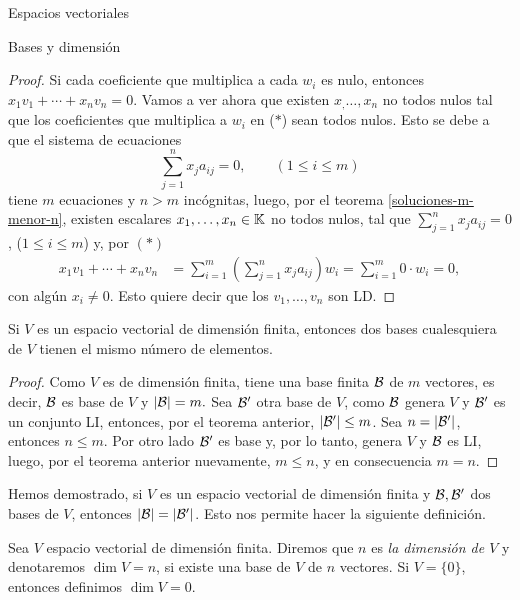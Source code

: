 \begin{chapter}{Espacios vectoriales}
\begin{section}{Bases y dimensi\'on}
\begin{proof}
    Si cada coeficiente que multiplica a cada $w_i$ es nulo, entonces $  x_1v_1 + \cdots+x_nv_n=0$. Vamos a ver ahora que existen $x_,\ldots,x_n$ no todos nulos tal que los coeficientes que multiplica a $w_i$  en ($*$) sean todos nulos. Esto se debe a que el sistema de ecuaciones
    \begin{equation*}
        \sum_{j=1}^{n} x_ja_{ij} = 0, \qquad (1 \le i \le m) 
    \end{equation*}
    tiene $m$ ecuaciones  y $n > m$ incógnitas, luego, por el teorema \ref{soluciones-m-menor-n}, existen escalares $x_1,\ldots,x_n \in \mathbb K$ no todos nulos, tal que $\sum_{j=1}^{n} x_ja_{ij} = 0$, ($1 \le i \le m$) y, por $(*)$
    \begin{align*}
        x_1v_1 + \cdots+x_nv_n &=  \sum_{i=1}^{m}(\sum_{j=1}^{n} x_ja_{ij})w_i = \sum_{i=1}^{m}0\cdot w_i =0,
    \end{align*}
    con algún $x_i \ne 0$. Esto quiere decir que los $v_1,\ldots,v_n$ son LD.
\end{proof}


\begin{corolario}
    Si $V$ es un espacio vectorial de dimensión finita, entonces dos bases cualesquiera de $V$ tienen el mismo número de elementos.
\end{corolario}
\begin{proof}
        Como $V$ es de dimensión finita, tiene una base finita $\mathcal{B}$  de $m$ vectores, es decir,  $\mathcal{B}$ es base de $V$ y  $|\mathcal{B}| = m.$
        Sea $\mathcal{B}'$  otra base de $V$, como $\mathcal{B}$  genera $V$ y  $\mathcal{B}'$ es  un conjunto LI, entonces, por el teorema anterior, $|\mathcal{B}'| \le m$. Sea $n = |\mathcal{B}'|$,  entonces $n \le m$. Por otro lado $\mathcal{B}'$ es base y, por lo tanto,  genera $V$ y  $\mathcal{B}$ es LI, luego, por el teorema anterior nuevamente,  $m \le n$, y en consecuencia $m=n$.
\end{proof}

Hemos demostrado, si $V$  es un espacio vectorial de dimensión finita y $\mathcal{B},\mathcal{B}' $ dos bases de $V$,  entonces $|\mathcal{B}|=|\mathcal{B}'|$. Esto nos permite hacer la siguiente definición. 


\begin{definicion}
    Sea $V$ espacio vectorial de dimensión finita. Diremos que $n$  es \textit{la dimensión de $V$} y  denotaremos $\dim V =n$,  si existe una base de $V$  de $n$  vectores. Si $V = \{0\}$,  entonces definimos $\dim V =0$.
\end{definicion}






\end{section}
\end{chapter}
